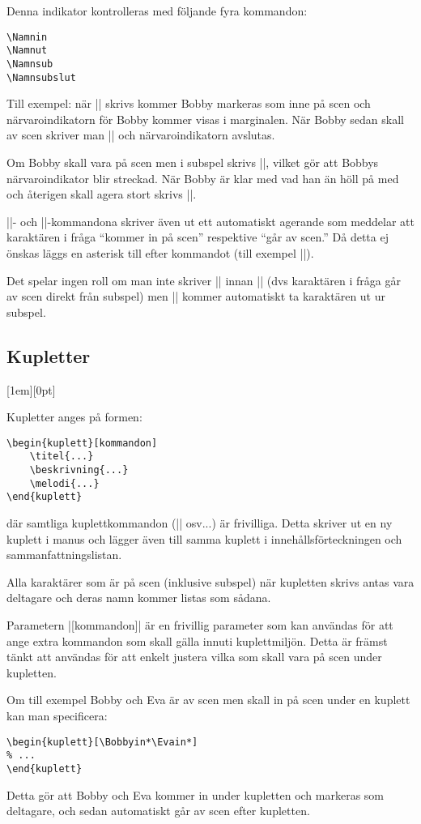 \documentclass[a4paper,12pt]{article}
\newcommand\funnybone[1]{%
	\raisebox{1em}[1em][0pt]{%
		\makebox[\textwidth][r]{\large\it eller, ``#1''}%
	}%
}
\begin{document}
Denna indikator kontrolleras med följande fyra kommandon:
\begin{lstlisting}
\Namnin
\Namnut
\Namnsub
\Namnsubslut
\end{lstlisting}

Till exempel: när |\Bobbyin| skrivs kommer Bobby markeras som inne på scen och närvaroindikatorn för Bobby kommer visas i marginalen. När Bobby sedan skall av scen skriver man |\Bobbyut| och närvaroindikatorn avslutas.

Om Bobby skall vara på scen men i subspel skrivs |\Bobbysub|, vilket gör att Bobbys närvaroindikator blir streckad. När Bobby är klar med vad han än höll på med och återigen skall agera stort skrivs |\Bobbysubslut|.

|\Namnin|- och |\Namnut|-kommandona skriver även ut ett automatiskt agerande som meddelar att karaktären i fråga ``kommer in på scen'' respektive ``går av scen.'' Då detta ej önskas läggs en asterisk till efter kommandot (till exempel |\Bobbyin*|).

Det spelar ingen roll om man inte skriver |\Namnsubslut| innan |\Namnut| (dvs karaktären i fråga går av scen direkt från subspel) men |\Namnin| kommer automatiskt ta karaktären ut ur subspel.



\subsection{Kupletter}
\funnybone{Allsång på Scenen}
Kupletter anges på formen:
\begin{lstlisting}
\begin{kuplett}[kommandon]
	\titel{...}
	\beskrivning{...}
	\melodi{...}
\end{kuplett}
\end{lstlisting}
där samtliga kuplettkommandon (|\titel| osv...) är frivilliga. Detta skriver ut en ny kuplett i manus och lägger även till samma kuplett i innehållsförteckningen och sammanfattningslistan.

Alla karaktärer som är på scen (inklusive subspel) när kupletten skrivs antas vara deltagare och deras namn kommer listas som sådana.

Parametern |[kommandon]| är en frivillig parameter som kan användas för att ange extra kommandon som skall gälla innuti kuplettmiljön. Detta är främst tänkt att användas för att enkelt justera vilka som skall vara på scen under kupletten.

Om till exempel Bobby och Eva är av scen men skall in på scen under en kuplett kan man specificera:
\begin{lstlisting}
\begin{kuplett}[\Bobbyin*\Evain*]
% ...
\end{kuplett}
\end{lstlisting}
Detta gör att Bobby och Eva kommer in under kupletten och markeras som deltagare, och sedan automatiskt går av scen efter kupletten.
\end{document}
